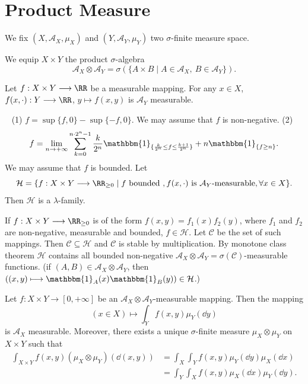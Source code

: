\section{Product Measure}
We fix $(X,\mathcal{A}_X,\mu_X)$ and $(Y,\mathcal{A}_Y, \mu_Y)$ two $\sigma$-finite measure space.

We equip $X\times Y$ the product $\sigma$-algebra
$$ \mathcal{A}_X \otimes \mathcal{A}_Y=\sigma\left(\{A\times B\mid A\in \mathcal{A}_X,\ B\in \mathcal{A}_Y\}\right).$$
\begin{propositionenv}
    Let $f:X\times Y\longrightarrow \RR$ be a measurable mapping. For any $x\in X$, $f(x,\cdot): Y\longrightarrow \RR$, $y\longmapsto f(x,y)$ is $\mathcal{A}_Y$ measurable.
\end{propositionenv}
\begin{proofenv}
    \ \newline
    (1) $f=\sup\{f,0\}-\sup\{-f,0\}$. We may assume that $f$ is non-negative.
    \newline
    (2) $$f=\lim_{n\rightarrow +\infty}\sum_{k=0}^{n\cdot2^n-1} \frac{k}{2^n}\mathbbm{1}_{\{\frac{k}{2^n}\le f\le \frac{k+1}{2^n}\}}+n\mathbbm{1}_{\{f\ge n\}}.$$
    We may assume that $f$ is bounded. Let 
    $$\mathcal{H}=\{f:X\times Y\longrightarrow \RR_{\ge 0}\mid f \text{ bounded }, f(x,\cdot) \text{ is } \mathcal{A}_Y\text{-measurable}, \forall x\in X\}.$$
    Then $\mathcal{H}$ is a $\lambda$-family.

    If $f:X\times Y\longrightarrow\RR_{\ge 0}$ is of the form $f(x,y)=f_1(x)f_2(y)$, where $f_1$ and $f_2$ are non-negative, measurable and bounded, $f\in \mathcal{H}$.
    Let $\mathcal{C}$ be the set of such mappings. Then $\mathcal{C}\subseteq \mathcal{H}$  and $\mathcal{C}$ is stable by multiplication. By monotone class theorem $\mathcal{H}$ contains all bounded non-negative $\mathcal{A}_X\otimes \mathcal{A}_Y=\sigma(\mathcal{C})$-measurable functions.
    (if $(A,B)\in \mathcal{A}_X\otimes \mathcal{A}_Y$, then $\left((x,y)\longmapsto \mathbbm{1}_{A}(x)\mathbbm{1}_B(y)\right)\in \mathcal{H}$.)
\end{proofenv}
\begin{theoremenv}
    Let $f:X\times Y\longrightarrow [0,+\infty]$ be an $\mathcal{A}_X\otimes \mathcal{A}_Y$-measurable mapping. Then the mapping
    $$ (x\in X)\longmapsto \int_{Y} f(x,y)\mu_Y(\dd y)$$
    is $\mathcal{A}_X$ measurable. Moreover, there exists a unique $\sigma$-finite measure $\mu_X\otimes \mu_Y$ on $X\times Y$ such that
    \begin{align*}
        \int_{X\times Y} f(x,y)(\mu_X\otimes \mu_Y)\left(\dd(x,y)\right)&=\int_{X}\int_{Y} f(x,y) \mu_Y(\dd y)\mu_X(\dd x)\\
        &=\int_{Y}\int_{X} f(x,y)\mu_X(\dd x)\mu_Y (\dd y).
    \end{align*}
\end{theoremenv}
